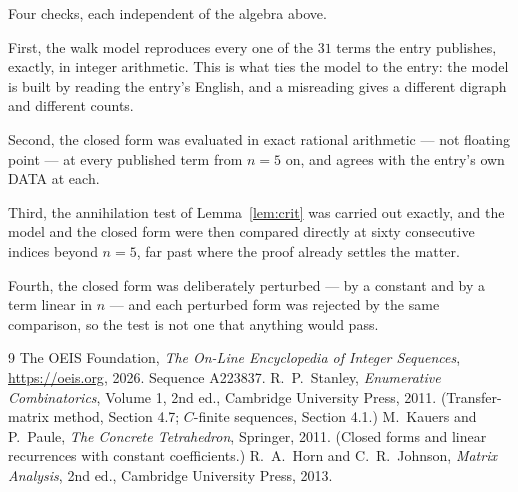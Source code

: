 \documentclass[11pt,a4paper]{article}
\theoremstyle{plain}
\theoremstyle{definition}
\begin{document}
Four checks, each independent of the algebra above.

First, the walk model reproduces every one of the $31$ terms the entry publishes,
exactly, in integer arithmetic. This is what ties the model to the entry: the model is built
by reading the entry's English, and a misreading gives a different digraph and different
counts.

Second, the closed form was evaluated in exact rational arithmetic --- not floating point ---
at every published term from $n=5$ on, and agrees with the entry's own DATA at each.

Third, the annihilation test of Lemma~\ref{lem:crit} was carried out exactly, and the model
and the closed form were then compared directly at sixty consecutive indices beyond
$n=5$, far past where the proof already settles the matter.

Fourth, the closed form was deliberately perturbed --- by a constant and by a term linear in
$n$ --- and each perturbed form was rejected by the same comparison, so the test is not one
that anything would pass.

\begin{thebibliography}{9}
 The OEIS Foundation, \emph{The On-Line Encyclopedia of Integer
Sequences}, \url{https://oeis.org}, 2026. Sequence A223837.
 R.~P.~Stanley, \emph{Enumerative Combinatorics}, Volume 1, 2nd ed.,
Cambridge University Press, 2011. (Transfer-matrix method, Section 4.7; $C$-finite sequences,
Section 4.1.)
 M.~Kauers and P.~Paule, \emph{The Concrete Tetrahedron}, Springer, 2011.
(Closed forms and linear recurrences with constant coefficients.)
 R.~A.~Horn and C.~R.~Johnson, \emph{Matrix Analysis}, 2nd ed., Cambridge
University Press, 2013.
\end{thebibliography}
\end{document}
